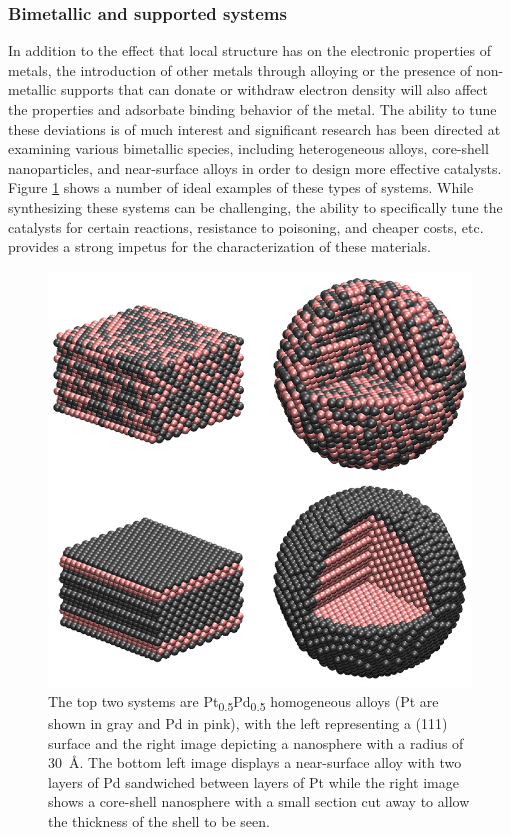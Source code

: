 \subsubsection{Bimetallic and supported systems}
In addition to the effect that local structure has on the electronic properties
of metals, the introduction of other metals through alloying or the presence of
non-metallic  supports that can donate or withdraw electron density will also
affect the properties and adsorbate binding behavior of the metal. The ability
to tune these deviations is of much interest and significant research has been
directed at examining various bimetallic species, including heterogeneous
alloys,\citep{Stamenkovic:2007kk, Yu:2013fr} core-shell
nanoparticles,\citep{Huang:2012ul, Tao:2008aa, Wang:2015qb} and near-surface
alloys\citep{Stephens:2011bv, Jan-Knudsen:2007fe} in order to design more effective
catalysts.  Figure \ref{fig:bimetallic} shows a number of ideal examples of
these types of systems. While synthesizing these systems can be challenging,
the ability to specifically tune the catalysts for certain reactions,
resistance to poisoning\citep{Yu:2013fr, Sharma:0ly}, and cheaper
costs\citep{Li:0hl, Zhao:0qf}, etc. provides a strong impetus for the
characterization of these materials.

\begin{figure}[p!]
  \centering
  \includegraphics[width=\linewidth]{../figures/chap1/bimetallic.pdf}
\caption{The top two systems are Pt\textsubscript{0.5}Pd\textsubscript{0.5}
homogeneous alloys (Pt are shown in gray and Pd in pink), with the left
representing a (111) surface and the right image depicting a nanosphere with a
radius of 30~\AA. The bottom left image displays a near-surface alloy with two
layers of Pd sandwiched between layers of Pt while the right image shows a
core-shell nanosphere with a small section cut away to allow the thickness of
the shell to be seen.}
\label{fig:bimetallic} 
\end{figure}

